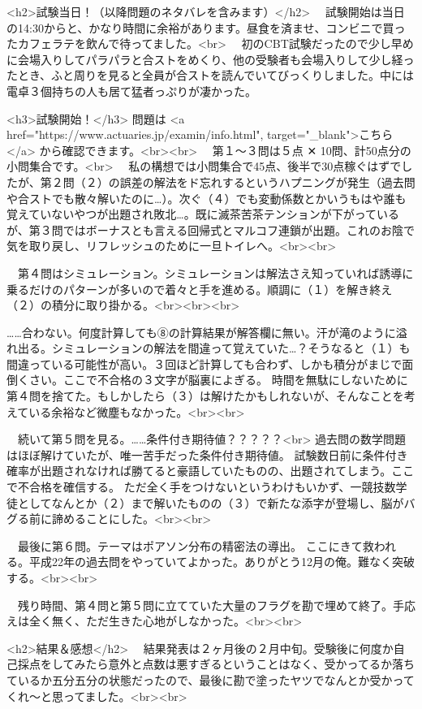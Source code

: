 <h2>試験当日！（以降問題のネタバレを含みます）</h2>
　試験開始は当日の14:30からと、かなり時間に余裕があります。昼食を済ませ、コンビニで買ったカフェラテを飲んで待ってました。<br>
　初のCBT試験だったので少し早めに会場入りしてパラパラと合ストをめくり、他の受験者も会場入りして少し経ったとき、ふと周りを見ると全員が合ストを読んでいてびっくりしました。中には電卓３個持ちの人も居て猛者っぷりが凄かった。

<h3>試験開始！</h3>
問題は <a href="https://www.actuaries.jp/examin/info.html", target="_blank">こちら</a> から確認できます。<br><br>
　第１～３問は５点 ✕ 10問、計50点分の小問集合です。<br>
　私の構想では小問集合で45点、後半で30点稼ぐはずでしたが、第２問（２）の誤差の解法をド忘れするというハプニングが発生（過去問や合ストでも散々解いたのに…）。次ぐ（４）でも変動係数とかいうもはや誰も覚えていないやつが出題され敗北…。既に滅茶苦茶テンションが下がっているが、第３問ではボーナスとも言える回帰式とマルコフ連鎖が出題。これのお陰で気を取り戻し、リフレッシュのために一旦トイレへ。<br><br>

　第４問はシミュレーション。シミュレーションは解法さえ知っていれば誘導に乗るだけのパターンが多いので着々と手を進める。順調に（１）を解き終え（２）の積分に取り掛かる。<br><br><br>

……合わない。何度計算しても⑧の計算結果が解答欄に無い。汗が滝のように溢れ出る。シミュレーションの解法を間違って覚えていた…？そうなると（１）も間違っている可能性が高い。３回ほど計算しても合わず、しかも積分がまじで面倒くさい。ここで不合格の３文字が脳裏によぎる。
時間を無駄にしないために第４問を捨てた。もしかしたら（３）は解けたかもしれないが、そんなことを考えている余裕など微塵もなかった。<br><br>

　続いて第５問を見る。……条件付き期待値？？？？？<br>
過去問の数学問題はほぼ解けていたが、唯一苦手だった条件付き期待値。
試験数日前に条件付き確率が出題されなければ勝てると豪語していたものの、出題されてしまう。ここで不合格を確信する。
ただ全く手をつけないというわけもいかず、一競技数学徒としてなんとか（２）まで解いたものの（３）で新たな添字が登場し、脳がバグる前に諦めることにした。<br><br>

　最後に第６問。テーマはポアソン分布の精密法の導出。
ここにきて救われる。平成22年の過去問をやっていてよかった。ありがとう12月の俺。難なく突破する。<br><br>

　残り時間、第４問と第５問に立てていた大量のフラグを勘で埋めて終了。手応えは全く無く、ただ生きた心地がしなかった。<br><br>

<h2>結果＆感想</h2>
　結果発表は２ヶ月後の２月中旬。受験後に何度か自己採点をしてみたら意外と点数は悪すぎるということはなく、受かってるか落ちているか五分五分の状態だったので、最後に勘で塗ったヤツでなんとか受かってくれ～と思ってました。<br><br>

